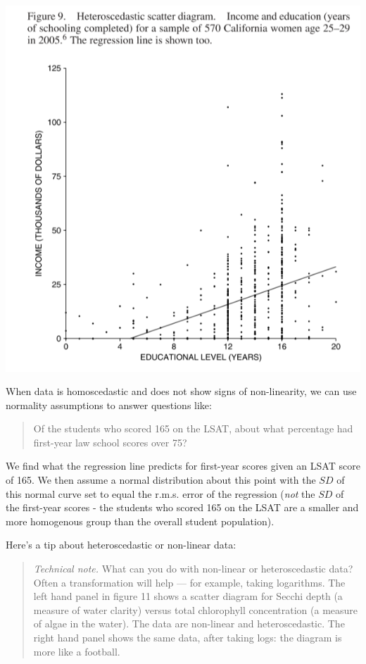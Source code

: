 \documentclass[
]{book}
\begin{document}
\includegraphics{images/Ch11Img05.png}

When data is homoscedastic and does not show signs of non-linearity, we can use normality assumptions to answer questions like:

\begin{quote}
Of the students who scored 165 on the LSAT, about what percentage had first-year law school scores over 75?
\end{quote}

We find what the regression line predicts for first-year scores given an LSAT score of 165. We then assume a normal distribution about this point with the \(SD\) of this normal curve set to equal the r.m.s. error of the regression (\emph{not} the \(SD\) of the first-year scores - the students who scored 165 on the LSAT are a smaller and more homogenous group than the overall student population).

Here's a tip about heteroscedastic or non-linear data:

\begin{quote}
\emph{Technical note.} What can you do with non-linear or heteroscedastic data? Often a transformation will help --- for example, taking logarithms. The left hand panel in figure 11 shows a scatter diagram for Secchi depth (a measure of water clarity) versus total chlorophyll concentration (a measure of algae in the water). The data are non-linear and heteroscedastic. The right hand panel shows the same data, after taking logs: the diagram is more like a football.
\end{quote}
\end{document}
